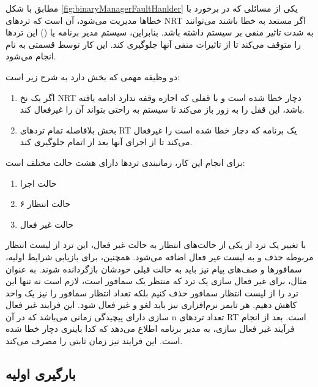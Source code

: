 \documentclass[10pt, a4paper]{article}
\begin{document}
مطابق با شکل \ref{fig:binaryManagerFaultHanlder} یکی از مسائلی که در برخورد با
خطا‌ها مدیریت می‌شود، آن است که ترد‌های NRT اگر مستعد به خطا باشند می‌توانند به
شدت تاثیر منفی بر سیستم داشته باشد. بنابراین، سیستم مدیر برنامه یا () این ترد‌ها را متوقف می‌کند تا از تاثیرات منفی آنها جلوگیری کند. این
کار توسط قسمتی به نام  انجام می‌شود.

دو وظیفه مهمی که بخش  دارد به شرح زیر است:

\begin{enumerate}
    \item اگر یک نخ NRT دچار خطا شده است و با قفلی که اجازه وقفه ندارد ادامه
    یافته باشد، این قفل را به زور باز می‌کند تا سیستم به راحتی بتواند آن را
    غیرفعال کند.
    \item بخش  بلافاصله تمام ترد‌های RT یک برنامه که دچار خطا
    شده است را غیرفعال می‌کند تا از اجرای آنها بعد از اتمام  جلوگیری کند.
\end{enumerate}

برای انجام این کار، زمانبندی ترد‌ها دارای هشت حالت مختلف است:

\begin{enumerate}
    \item حالت اجرا
    \item ۶ حالت انتظار
    \item حالت غیر فعال
\end{enumerate}


با تغییر یک ترد از یکی از حالت‌های انتظار به حالت غیر فعال، این ترد از لیست
انتظار مربوطه حذف و به لیست غیر فعال اضافه می‌شود. همچنین، برای بازیابی شرایط
اولیه، سمافور‌ها و صف‌های پیام نیز باید به حالت قبلی خودشان بازگردانده شوند. به
عنوان مثال، برای غیر فعال سازی یک ترد که منتظر یک سمافور است، لازم است نه تنها
این ترد را از لیست انتظار سمافور حذف کنیم بلکه تعداد انتظار سمافور را نیز یک
واحد کاهش دهیم. هر تایمر نرم‌افزاری نیز باید لغو و غیر فعال شود. این فرایند غیر
فعال سازی دارای پیچیدگی زمانی  می‌باشد که در آن n تعداد ترد‌های RT است.
بعد از انجام فرآیند غیر فعال سازی،  به مدیر برنامه اطلاع
می‌دهد که کدا باینری دچار خطا شده است. این فرایند نیز زمان ثابتی را مصرف می‌کند.

\subsection{بارگیری اولیه}
\end{document}
